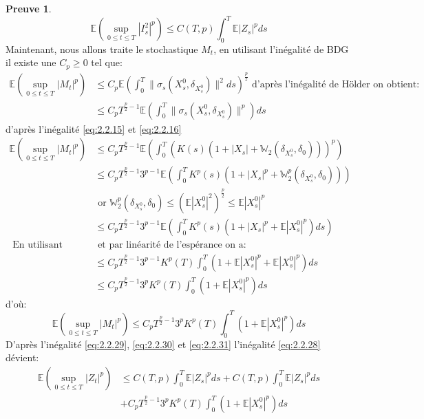\documentclass[12pt,a4paper,twoside,fleqn]{book}%
\theoremstyle{definition}
\newtheorem*{pr}{\textbf{Preuve}}
\theoremstyle{lemme}
\numberwithin{equation}{section}
\begin{document}
\begin{pr}
\begin{equation}
	\mathbb{E}\left(\sup_{0\leq t \leq T}|I_s^2|^p\right)\leq C(T,p)\int_{0}^{T}\mathbb{E}|Z_s|^pds
\end{equation}
Maintenant, nous allons traite le stochastique $M_t$, en utilisant l'inégalité de BDG il existe une $C_p\geq0$ tel que:
\[
\begin{aligned}
\mathbb{E}\left(\sup_{0\leq t \leq T}|M_t|^p\right)&\leq C_p\mathbb{E}\left(\int_{0}^{T}\|\sigma_s(X_s^0,\delta_{X_s^0})\|^2ds\right)^{\frac{p}{2}} \text{ d'après l'inégalité de Hölder on obtient: }\\
&\leq C_pT^{\frac{p}{2}-1}\mathbb{E}\left(\int_{0}^{T}\|\sigma_s(X_s^0,\delta_{X_s^0})\|^p\right)ds
\end{aligned}
\]
d'après l'inégalité \ref{eq:2.2.15} et \ref{eq:2.2.16}
\[
\begin{aligned}
	\mathbb{E}\left(\sup_{0\leq t \leq T}|M_t|^p\right)&\leq C_pT^{\frac{p}{2}-1}\mathbb{E}\left(\int_{0}^{T}\left(K(s)(1 + |X_s| + \mathbb{W}_2(\delta_{X_s^0},\delta_{0}))\right)^p\right)\\
	&\leq C_pT^{\frac{p}{2}-1}3^{p-1}\mathbb{E}\left(\int_{0}^{T}K^p(s)(1 + |X_s|^p +\mathbb{W}_2^p(\delta_{X_s^0},\delta_{0}))\right)\\ &\text{ or } \mathbb{W}_2^p(\delta_{X_s^0},\delta_{0})\leq \left(\mathbb{E}|X_s^0|^2\right)^{\frac{p}{2}}\leq\mathbb{E}|X_s^0|^p\\
	&\leq C_pT^{\frac{p}{2}-1}3^{p-1}\mathbb{E}\left(\int_{0}^{T}K^p(s)(1 + |X_s|^p + \mathbb{E}|X_s^0|^p)ds\right)\\
		\text{ En utilisant l'inégalité de Jensen} &\text{ et par linéarité de l'espérance on a:}\\
		&\leq C_pT^{\frac{p}{2}-1}3^{p-1}K^p(T)\int_{0}^{T}(1+\mathbb{E}|X_s^0|^p + \mathbb{E}|X_s^0|^p)ds\\
		&\leq C_pT^{\frac{p}{2}-1}3^{p}K^p(T)\int_{0}^{T}\left(1 + \mathbb{E}|X_s^0|^p\right)ds		
\end{aligned}
\]
d'où:
\begin{equation}\label{eq:2.2.31}
	\mathbb{E}\left(\sup_{0\leq t \leq T}|M_t|^p\right)\leq C_pT^{\frac{p}{2}-1}3^{p}K^p(T)\int_{0}^{T}\left(1+\mathbb{E}|X_s^0|^p\right)ds
\end{equation}
D'après l'inégalité \ref{eq:2.2.29}, \ref{eq:2.2.30} et \ref{eq:2.2.31} l'inégalité \ref{eq:2.2.28} dévient:
\[
\begin{aligned}
\mathbb{E}\left(\sup_{0\leq t \leq T}|Z_t|^p\right)&\leq C(T,p)\int_{0}^{T}\mathbb{E}|Z_s|^pds + C(T,p)\int_{0}^{T}\mathbb{E}|Z_s|^pds\\ &+C_pT^{\frac{p}{2}-1}3^{p}K^p(T)\int_{0}^{T}\left(1+\mathbb{E}|X_s^0|^p\right)ds\\

\end{aligned}\]
\end{pr}
\end{document}
